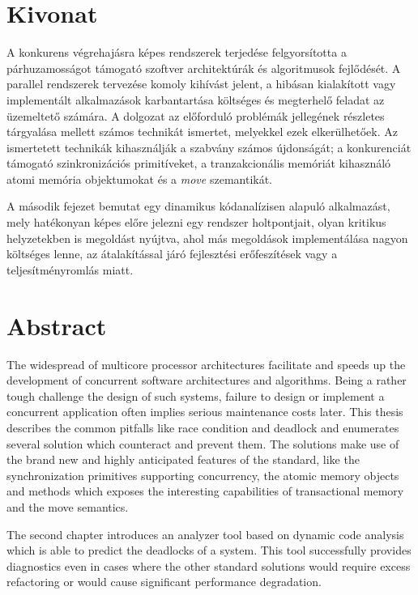 \chapter*{Kivonat}

A konkurens végrehajásra képes rendszerek terjedése felgyorsította a párhuzamosságot támogató szoftver architektúrák és algoritmusok fejlődését. A parallel rendszerek tervezése komoly kihívást jelent, a hibásan kialakított vagy implementált alkalmazások karbantartása költséges és megterhelő feladat az üzemeltető számára. A dolgozat az előforduló problémák jellegének részletes tárgyalása mellett számos technikát ismertet, melyekkel ezek elkerülhetőek. Az ismertetett technikák kihasználják a \cite{C++11} szabvány számos újdonságát; a konkurenciát támogató szinkronizációs primitíveket, a tranzakcionális memóriát kihasználó atomi memória objektumokat és a \emph{move} szemantikát.

A második fejezet bemutat egy dinamikus kódanalízisen alapuló alkalmazást, mely hatékonyan képes előre jelezni egy rendszer holtpontjait, olyan kritikus helyzetekben is megoldást nyújtva, ahol más megoldások implementálása nagyon költséges lenne, az átalakítással járó fejlesztési erőfeszítések vagy a teljesítményromlás miatt.
\vfill

\chapter*{Abstract}

The widespread of multicore processor architectures facilitate and speeds up the development of concurrent software architectures and algorithms. Being a rather tough challenge the design of such systems, failure to design or implement a concurrent application often implies serious maintenance costs later. This thesis describes the common pitfalls like race condition and deadlock and enumerates several solution which counteract and prevent them. The solutions make use of the brand new and highly anticipated features of the \cite{C++11} standard, like the synchronization primitives supporting concurrency, the atomic memory objects and methods which exposes the interesting capabilities of transactional memory and the move semantics.

The second chapter introduces an analyzer tool based on dynamic code analysis which is able to predict the deadlocks of a system. This tool successfully provides diagnostics even in cases where the other standard solutions would require excess refactoring or would cause significant performance degradation.
\vfill 

